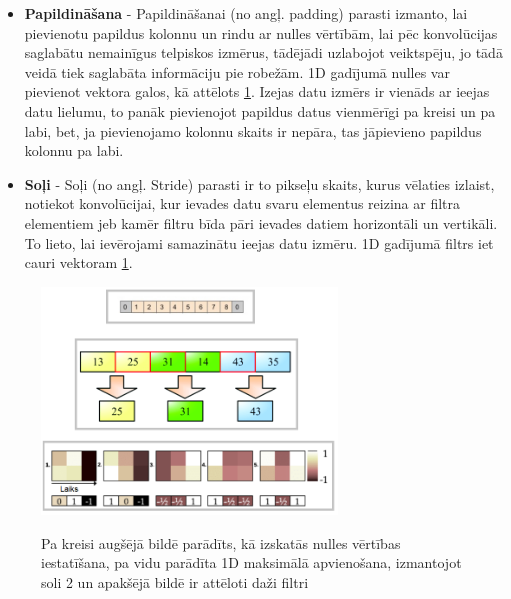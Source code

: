 \documentclass[12pt,paper=A4]{report}
\begin{document}
\begin{itemize}
\item \textbf{Papildināšana} - Papildināšanai (no angļ. padding) parasti izmanto, lai pievienotu papildus kolonnu un rindu ar nulles vērtībām, lai pēc konvolūcijas saglabātu nemainīgus telpiskos izmērus, tādējādi uzlabojot veiktspēju, jo tādā veidā tiek saglabāta informāciju pie robežām. 1D gadījumā nulles var pievienot vektora galos, kā attēlots \ref{hyperParams}. Izejas datu izmērs ir vienāds ar ieejas datu lielumu, to panāk pievienojot papildus datus vienmērīgi pa kreisi un pa labi, bet, ja pievienojamo kolonnu skaits ir nepāra, tas jāpievieno papildus kolonnu pa labi.

\item \textbf{Soļi} - Soļi (no angļ. Stride) parasti ir to pikseļu skaits, kurus vēlaties izlaist, notiekot konvolūcijai, kur ievades datu svaru elementus reizina ar filtra elementiem jeb kamēr filtru bīda pāri ievades datiem horizontāli un vertikāli. To lieto, lai ievērojami samazinātu ieejas datu izmēru. 1D gadījumā filtrs iet cauri vektoram \ref{hyperParams}.

\end{itemize}



\begin{figure}[H] \centering
\includegraphics[width=0.70\textwidth]{hyperParams} 
\caption{Pa kreisi augšējā bildē parādīts, kā izskatās nulles vērtības iestatīšana, pa vidu parādīta 1D maksimālā apvienošana, izmantojot soli 2 un apakšējā bildē ir attēloti daži filtri} 
\cite{article123asd} \cite{inproceedings} \cite{1DzerroPadding} \label{hyperParams} 
\end{figure}
\end{document}
